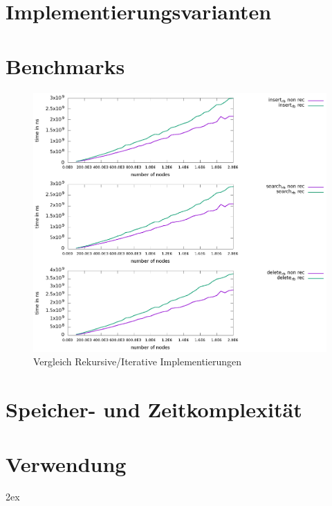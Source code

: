 \documentclass[11pt]{article}
\begin{document}
\pagebreak

\section{Implementierungsvarianten}
\pagebreak

\section{Benchmarks}

\begin{figure}[h]
  \includegraphics{../benchmark/compare_insert.png}
  \caption{Vergleich Rekursive/Iterative Implementierungen}
\end{figure}
\pagebreak

\section{Speicher- und Zeitkomplexität} \label{time}
\pagebreak

\section{Verwendung}
\pagebreak

\begingroup
\parindent 0pt
\parskip 2ex
\def\enotesize{\normalsize}
\theendnotes
\endgroup


\end{document}
